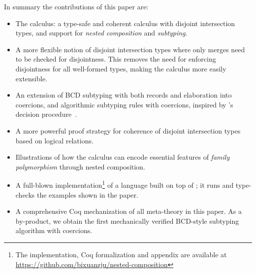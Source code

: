 In summary the contributions of this paper are:

\begin{itemize}

\item The \name calculus: a type-safe and coherent calculus with
  disjoint intersection types, and
  support for \emph{nested composition} and \emph{subtyping}. 

\item A more flexible notion of disjoint intersection types where 
only merges need to be checked for disjointness. This removes the need 
for enforcing disjointness for all well-formed types, making the
calculus more easily extensible.

\item An extension of BCD subtyping with both records and elaboration into coercions, 
  and
  algorithmic subtyping rules with coercions, inspired by
  \citeauthor{pierce1989decision}'s decision
  procedure~\citep{pierce1989decision}.

\item A more powerful proof strategy for coherence of disjoint
  intersection types based on logical
  relations. 

\item Illustrations of how the calculus can encode essential features 
of \emph{family polymorphism} through nested composition.

\item A full-blown implementation\footnote{The implementation, Coq formalization and
  appendix are available at \url{https://github.com/bixuanzju/nested-composition}} of a language built
on top of \name; it runs and type-checks the 
examples shown in the paper.

\item A comprehensive Coq mechanization of all meta-theory in this paper. As a by-product, we obtain the first mechanically
  verified BCD-style subtyping algorithm with coercions.

\end{itemize}

